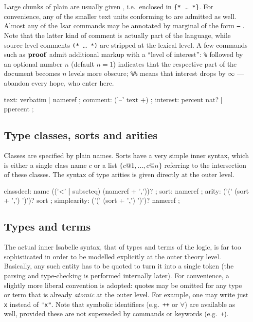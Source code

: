 Large chunks of plain  are usually given
, i.e.\ enclosed in \verb|{*|~\dots~\verb|*}|.  For
convenience, any of the smaller text units conforming to 
are admitted as well.  Almost any of the Isar commands may be annotated by
marginal  of the form \texttt{--} .
Note that the latter kind of comment is actually part of the language, while
source level comments \verb|(*|~\dots~\verb|*)| are stripped at the lexical
level.  A few commands such as ${\mathord{\mathbf{proof}}}$ admit additional markup with a
``level of interest'': \texttt{\%} followed by an optional number $n$ (default
$n = 1$) indicates that the respective part of the document becomes $n$ levels
more obscure; \texttt{\%\%} means that interest drops by $\infty$ --- abandon
every hope, who enter here.

\begin{rail}
  text: verbatim | nameref
  ;
  comment: ('--' text +)
  ;
  interest: percent nat? | ppercent
  ;
\end{rail}


\subsection{Type classes, sorts and arities}

Classes are specified by plain names.  Sorts have a very simple inner syntax,
which is either a single class name $c$ or a list $\{c@1, \dots, c@n\}$
referring to the intersection of these classes.  The syntax of type arities is
given directly at the outer level.


\begin{rail}
  classdecl: name (('<' | subseteq) (nameref + ','))?
  ;
  sort: nameref
  ;
  arity: ('(' (sort + ',') ')')? sort
  ;
  simplearity: ('(' (sort + ',') ')')? nameref
  ;
\end{rail}


\subsection{Types and terms}\label{sec:types-terms}

The actual inner Isabelle syntax, that of types and terms of the logic, is far
too sophisticated in order to be modelled explicitly at the outer theory
level.  Basically, any such entity has to be quoted to turn it into a single
token (the parsing and type-checking is performed internally later).  For
convenience, a slightly more liberal convention is adopted: quotes may be
omitted for any type or term that is already \emph{atomic} at the outer level.
For example, one may write just \texttt{x} instead of \texttt{"x"}.  Note that
symbolic identifiers (e.g.\ \texttt{++} or $\forall$) are available as well,
provided these are not superseded by commands or keywords (e.g.\ \texttt{+}).

